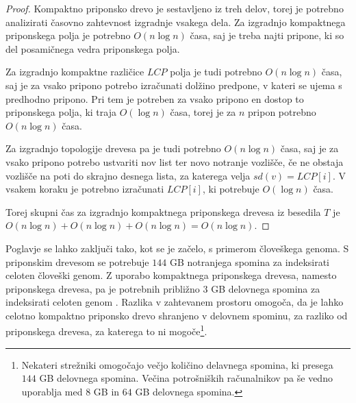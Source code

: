 \begin{proof}
    Kompaktno priponsko drevo je sestavljeno iz treh delov, torej je potrebno analizirati časovno zahtevnost izgradnje vsakega dela. Za izgradnjo kompaktnega priponskega polja je potrebno $O(n\log{n})$ časa, saj je treba najti pripone, ki so del posamičnega vedra priponskega polja.
    
    Za izgradnjo kompaktne različice $LCP$ polja je tudi potrebno $O(n\log{n})$ časa, saj je za vsako pripono potrebo izračunati dolžino predpone, v kateri se ujema s predhodno pripono. Pri tem je potreben za vsako pripono en dostop to priponskega polja, ki traja $O(\log{n})$ časa, torej je za $n$ pripon potrebno $O(n\log{n})$ časa.

    Za izgradnjo topologije drevesa pa je tudi potrebno $O(n\log{n})$ časa, saj je za vsako pripono potrebo ustvariti nov list ter novo notranje vozlišče, če ne obstaja vozlišče na poti do skrajno desnega lista, za katerega velja $sd(v)=LCP[i]$. V vsakem koraku je potrebno izračunati $LCP[i]$, ki potrebuje $O(\log{n})$ časa.

    Torej skupni čas za izgradnjo kompaktnega priponskega drevesa iz besedila $T$ je $O(n\log{n})+O(n\log{n})+O(n\log{n})=O(n\log{n})$.
\end{proof}

Poglavje se lahko zaključi tako, kot se je začelo, s primerom človeškega genoma. S priponskim drevesom se potrebuje $144$ GB notranjega spomina za indeksirati celoten človeški genom. Z  uporabo kompaktnega priponskega drevesa, namesto priponskega drevesa, pa je potrebnih približno $3$ GB delovnega spomina za indeksirati celoten genom \cite{Russo2008}. Razlika v zahtevanem prostoru omogoča, da je lahko celotno kompaktno priponsko drevo shranjeno v delovnem spominu, za razliko od priponskega drevesa, za katerega to ni mogoče\footnote{Nekateri strežniki omogočajo večjo količino delavnega spomina, ki presega $144$ GB delovnega spomina. Večina potrošniških računalnikov pa še vedno uporablja med $8$ GB in $64$ GB delovnega spomina.}.
